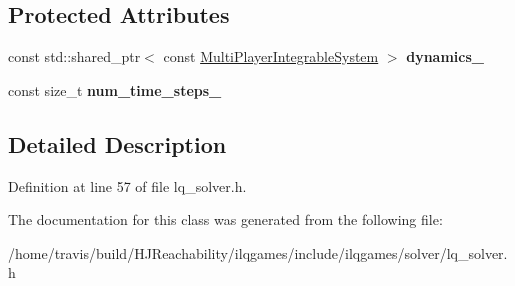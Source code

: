 \subsection*{Protected Attributes}
\begin{DoxyCompactItemize}
\item 
const std\+::shared\+\_\+ptr$<$ const \hyperlink{classilqgames_1_1_multi_player_integrable_system}{Multi\+Player\+Integrable\+System} $>$ {\bfseries dynamics\+\_\+}\hypertarget{classilqgames_1_1_l_q_solver_a22c4249fdbf20669711fea2896e74fc5}{}\label{classilqgames_1_1_l_q_solver_a22c4249fdbf20669711fea2896e74fc5}

\item 
const size\+\_\+t {\bfseries num\+\_\+time\+\_\+steps\+\_\+}\hypertarget{classilqgames_1_1_l_q_solver_addcae93427e1ebc2dfa0f44d5dd88569}{}\label{classilqgames_1_1_l_q_solver_addcae93427e1ebc2dfa0f44d5dd88569}

\end{DoxyCompactItemize}


\subsection{Detailed Description}


Definition at line 57 of file lq\+\_\+solver.\+h.



The documentation for this class was generated from the following file\+:\begin{DoxyCompactItemize}
\item 
/home/travis/build/\+H\+J\+Reachability/ilqgames/include/ilqgames/solver/lq\+\_\+solver.\+h\end{DoxyCompactItemize}
